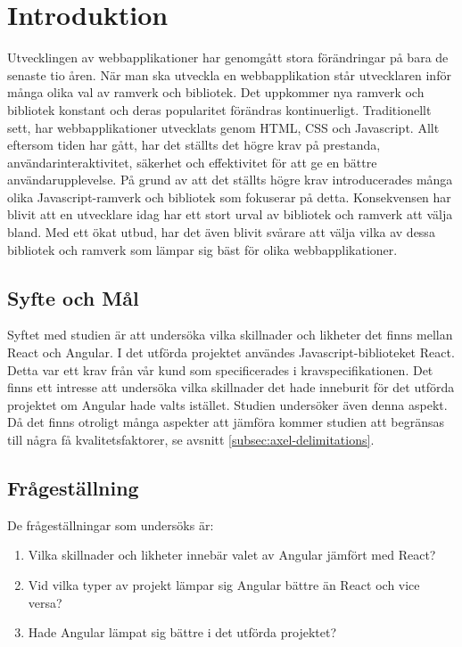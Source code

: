 \section{Introduktion}
\label{sec:axel-introduction}
Utvecklingen av webbapplikationer har genomgått stora förändringar på bara de senaste tio åren. \cite{changing} När man ska utveckla en webbapplikation står utvecklaren inför många olika val av ramverk och bibliotek. Det uppkommer nya ramverk och bibliotek konstant och deras popularitet förändras kontinuerligt. Traditionellt sett, har webbapplikationer utvecklats genom HTML, CSS och Javascript. Allt eftersom tiden har gått, har det ställts det högre krav på prestanda, användarinteraktivitet, säkerhet och effektivitet för att ge en bättre användarupplevelse. På grund av att det ställts högre krav introducerades många olika Javascript-ramverk och bibliotek som fokuserar på detta. Konsekvensen har blivit att en utvecklare idag har ett stort urval av bibliotek och ramverk att välja bland. Med ett ökat utbud, har det även blivit svårare att välja vilka av dessa bibliotek och ramverk som lämpar sig bäst för olika webbapplikationer.

\subsection{Syfte och Mål}
\label{subsec:motivation}

Syftet med studien är att undersöka vilka skillnader och likheter det finns mellan React och Angular. I det utförda projektet användes Javascript-biblioteket React. Detta var ett krav från vår kund som specificerades i kravspecifikationen. Det finns ett intresse att undersöka vilka skillnader det hade inneburit för det utförda projektet om Angular hade valts istället. Studien undersöker även denna aspekt. Då det finns otroligt många aspekter att jämföra kommer studien att begränsas till några få kvalitetsfaktorer, se avsnitt      \ref{subsec:axel-delimitations}.

\subsection{Frågeställning}
\label{subsec:research-questions}

De frågeställningar som undersöks är:

\begin{enumerate}
\item\label{axel-fs:1} Vilka skillnader och likheter innebär valet av Angular jämfört med React?

\item\label{axel-fs:2} Vid vilka typer av projekt lämpar sig Angular bättre än React och vice versa?

\item\label{axel-fs:3} Hade Angular lämpat sig bättre i det utförda projektet?


\end{enumerate}


